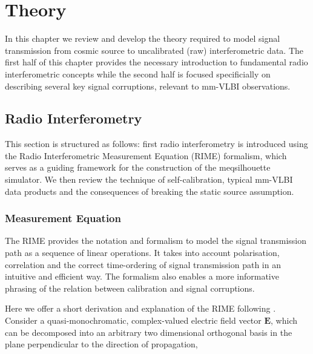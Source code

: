 \chapter{Theory}\label{chap:theory}
In this chapter we review and develop the theory required to model signal transmission from cosmic source to uncalibrated (raw) interferometric data. The first half of this chapter provides the necessary introduction to fundamental radio interferometric concepts while the second half is focused specificially on describing several key signal corruptions, relevant to mm-VLBI observations. 

\section{Radio Interferometry}\label{sec:radio_int}

This section is structured as follows: first radio interferometry is introduced using the Radio Interferometric Measurement Equation (RIME) formalism, which serves as a guiding framework for the construction of the {\sc meqsilhouette} simulator. We then review the technique of self-calibration, typical mm-VLBI data products and the consequences of breaking the static source assumption.

\subsection{Measurement Equation}\label{sec:RIME}

The RIME provides the notation and formalism to model the signal transmission path as a sequence of linear operations. It takes into account polarisation, correlation and the correct time-ordering of signal transmission path in an intuitive and efficient way. The formalism also enables a more informative phrasing of the relation between calibration and signal corruptions.


Here we offer a short derivation and explanation of the RIME following \citet{Smirnov_2011a}. Consider a quasi-monochromatic, complex-valued electric field vector $\bm{E}$, which can be decomposed into an arbitrary two dimensional orthogonal basis in the plane perpendicular to the direction of propagation,

